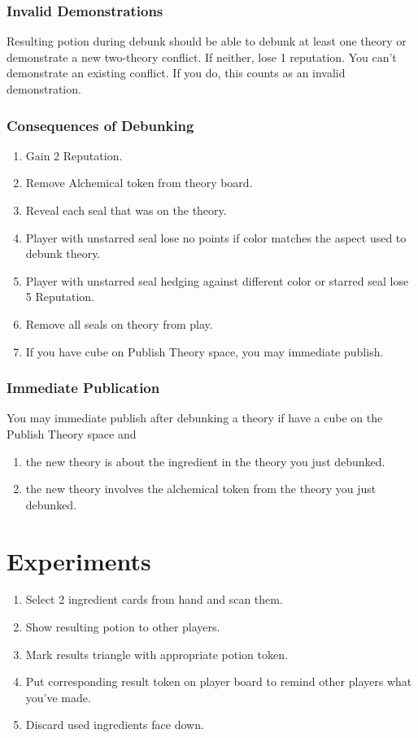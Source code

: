 \documentclass[12pt]{article}
\newenvironment{enumerateCustom}
{\begin{enumerate}
  \setlength{\itemsep}{1pt}
  \setlength{\parskip}{0pt}
  \setlength{\parsep}{0pt}}
{\end{enumerate}}
\begin{document}
\begin{multicols*}{2}
\subsubsection*{Invalid Demonstrations}
Resulting potion during debunk should be able to debunk at least one theory or demonstrate a new two-theory conflict. If neither, lose 1 reputation. You can't demonstrate an existing conflict. If you do, this counts as an invalid demonstration.

\subsubsection*{Consequences of Debunking}
\begin{enumerateCustom}
    \item Gain 2 Reputation.
    \item Remove Alchemical token from theory board.
    \item Reveal each seal that was on the theory.
    \item Player with unstarred seal lose no points if color matches the aspect used to debunk theory.
    \item Player with unstarred seal hedging against different color or starred seal lose 5 Reputation.
    \item Remove all seals on theory from play.
    \item If you have cube on Publish Theory space, you may immediate publish.
\end{enumerateCustom}

\subsubsection*{Immediate Publication}
You may immediate publish after debunking a theory if have a cube on the Publish Theory space and
\begin{enumerateCustom}
    \item the new theory is about the ingredient in the theory you just debunked.
    \item the new theory involves the alchemical token from the theory you just debunked.
\end{enumerateCustom}

\section*{Experiments}
\begin{enumerateCustom}
    \item Select 2 ingredient cards from hand and scan them.
    \item Show resulting potion to other players.
    \item Mark results triangle with appropriate potion token.
    \item Put corresponding result token on player board to remind other players what you've made.
    \item Discard used ingredients face down.
\end{enumerateCustom}


\end{multicols*}
\end{document}
